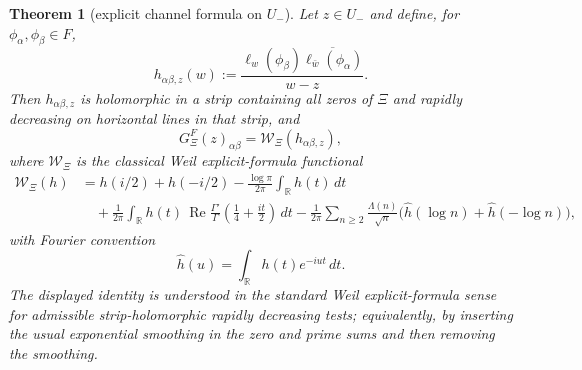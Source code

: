 \documentclass[11pt]{amsart}
\newtheorem{theorem}{Theorem}[section]
\theoremstyle{definition}
\theoremstyle{remark}
\theoremstyle{definition}
\renewcommand{\Re}{\operatorname{Re}}
\newcommand{\R}{\mathbb{R}}
\newcommand{\GXi}{G_\Xi}
\begin{document}
\begin{theorem}[explicit channel formula on $U_-$]\label{thm:explicit-channel}
Let $z\in U_-$ and define, for $\phi_\alpha,\phi_\beta\in F$,
\[
   h_{\alpha\beta,z}(w)
   :=
   \frac{\ell_w(\phi_\beta)\overline{\ell_{\bar w}(\phi_\alpha)}}{w-z}.
\]
Then $h_{\alpha\beta,z}$ is holomorphic in a strip containing all zeros of $\Xi$ and rapidly decreasing
on horizontal lines in that strip, and
\[
   \GXi^F(z)_{\alpha\beta}=\mathcal W_\Xi(h_{\alpha\beta,z}),
\]
where $\mathcal W_\Xi$ is the classical Weil explicit-formula functional
\begin{align*}
   \mathcal W_\Xi(h)
   &=
   h(i/2)+h(-i/2)
   -\frac{\log\pi}{2\pi}\int_\R h(t)\,dt \\
   &\quad
   +\frac{1}{2\pi}\int_\R h(t)\,
      \Re\frac{\Gamma'}{\Gamma}\!\left(\frac14+\frac{it}{2}\right)\,dt
   -\frac{1}{2\pi}\sum_{n\ge2}\frac{\Lambda(n)}{\sqrt n}
      \bigl(\widehat h(\log n)+\widehat h(-\log n)\bigr),
\end{align*}
with Fourier convention
\[
   \widehat h(u)=\int_\R h(t)e^{-iut}\,dt .
\]
The displayed identity is understood in the standard Weil explicit-formula sense for admissible
strip-holomorphic rapidly decreasing tests; equivalently, by inserting the usual exponential smoothing in
the zero and prime sums and then removing the smoothing.
\end{theorem}
\end{document}
